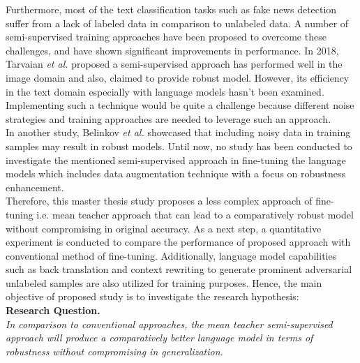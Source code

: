 \documentclass[%
	BCOR=8mm, %
	DIV=12,
	toc=bibliography, %
	toc=listof, %
	oneside, %
	egregdoesnotlikesansseriftitles, %
	]{scrbook}
\begin{document}
Furthermore, most of the text classification tasks such as fake news detection suffer from a lack of labeled data in comparison to unlabeled data. A number of semi-supervised training approaches have been proposed to overcome these challenges, and  have shown significant improvements in performance. In 2018, Tarvaian \textit{et al.} \cite{tarvainen_mean_2018} proposed a semi-supervised approach has performed well in the image domain and also, claimed to provide robust model. However, its efficiency in the text domain especially with language models hasn't been examined. Implementing such a technique would be quite a challenge because different noise strategies and training approaches are needed to leverage such an approach.\\
In another study, Belinkov \textit{et al.} \cite{belinkov_synthetic_2018} showcased that including noisy data in training samples may result in robust models.  Until now, no study has been conducted to investigate the mentioned semi-supervised approach in fine-tuning the language models which includes data augmentation technique with a focus on robustness enhancement. \\
Therefore, this master thesis study proposes a less complex approach of fine-tuning i.e. mean teacher approach that can lead to a comparatively robust model without compromising in original accuracy. As a next step, a quantitative experiment is conducted to compare the performance of proposed approach with conventional method of fine-tuning. Additionally, language model capabilities such as back translation and context rewriting to generate prominent adversarial unlabeled samples are also utilized for training purposes. Hence, the main objective of proposed study is to investigate the research hypothesis:\\
\textbf{Research Question.} \\
\emph{In comparison to conventional approaches, the mean teacher semi-supervised approach will produce a comparatively better language model in terms of robustness without compromising in generalization.}\\
\end{document}
